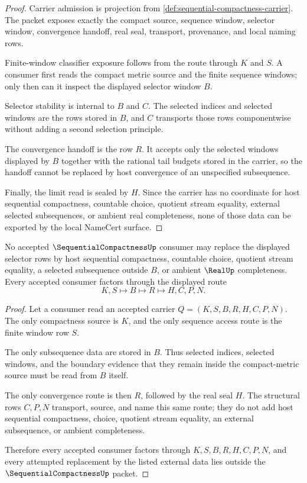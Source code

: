 \begin{proof}
Carrier admission is projection from \autoref{def:sequential-compactness-carrier}. The packet exposes exactly the compact source, sequence window, selector window, convergence handoff, real seal, transport, provenance, and local naming rows.

Finite-window classifier exposure follows from the route through $K$ and $S$. A consumer first reads the compact metric source and the finite sequence windows; only then can it inspect the displayed selector window $B$.

Selector stability is internal to $B$ and $C$. The selected indices and selected windows are the rows stored in $B$, and $C$ transports those rows componentwise without adding a second selection principle.

The convergence handoff is the row $R$. It accepts only the selected windows displayed by $B$ together with the rational tail budgets stored in the carrier, so the handoff cannot be replaced by host convergence of an unspecified subsequence.

Finally, the limit read is sealed by $H$. Since the carrier has no coordinate for host sequential compactness, countable choice, quotient stream equality, external selected subsequences, or ambient real completeness, none of those data can be exported by the local NameCert surface.
\end{proof}

\begin{theorem}
\label{thm:sequential-compactness-selector-refusal}
No accepted $\SequentialCompactnessUp$ consumer may replace the displayed selector rows by host sequential compactness, countable choice, quotient stream equality, a selected subsequence outside $B$, or ambient $\RealUp$ completeness. Every accepted consumer factors through the displayed route
$$
K,S \longmapsto B \longmapsto R \longmapsto H,C,P,N .
$$
\end{theorem}
\begin{proof}
Let a consumer read an accepted carrier $Q=(K,S,B,R,H,C,P,N)$. The only compactness source is $K$, and the only sequence access route is the finite window row $S$.

The only subsequence data are stored in $B$. Thus selected indices, selected windows, and the boundary evidence that they remain inside the compact-metric source must be read from $B$ itself.

The only convergence route is then $R$, followed by the real seal $H$. The structural rows $C,P,N$ transport, source, and name this same route; they do not add host sequential compactness, choice, quotient stream equality, an external subsequence, or ambient completeness.

Therefore every accepted consumer factors through $K,S,B,R,H,C,P,N$, and every attempted replacement by the listed external data lies outside the $\SequentialCompactnessUp$ packet.
\end{proof}

